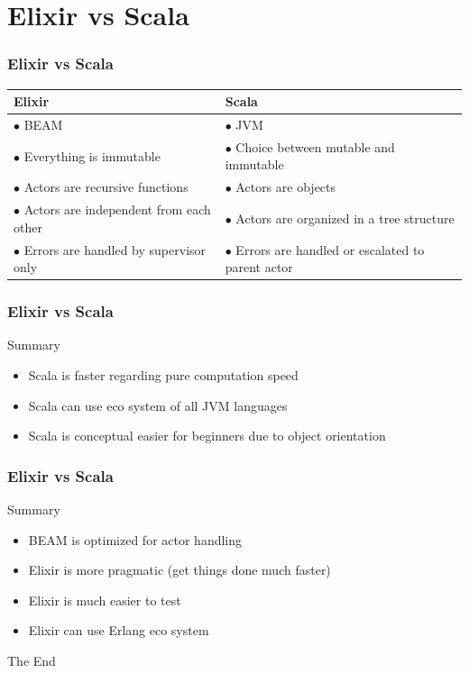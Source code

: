 \documentclass{beamer}
\begin{document}

\section{Elixir vs Scala}


\begin{frame}
\frametitle{Elixir vs Scala}
\begin{table}
\begin{tabular}{p{5cm} p{5cm}}
\toprule
\textbf{Elixir} & \textbf{Scala}\\
\midrule
$\bullet$ BEAM & $\bullet$ JVM \\
$\bullet$ Everything is immutable & $\bullet$ Choice between mutable and immutable\\
$\bullet$ Actors are recursive functions & $\bullet$ Actors are objects\\
$\bullet$ Actors are independent from each other & $\bullet$ Actors are organized in a tree structure \\
$\bullet$ Errors are handled by supervisor only & $\bullet$ Errors are handled or escalated to parent actor\\\bottomrule
\end{tabular}
\end{table}
\end{frame}



\begin{frame}
\frametitle{Elixir vs Scala}
\Huge{Summary}
\Large
\begin{itemize}
\item Scala is faster regarding pure computation speed
\item Scala can use eco system of all JVM languages
\item Scala is conceptual easier for beginners due to object orientation
\end{itemize}
\end{frame}


\begin{frame}
\frametitle{Elixir vs Scala}
\Huge{Summary}
\Large
\begin{itemize}
\item BEAM is optimized for actor handling
\item Elixir is more pragmatic (get things done much faster)
\item Elixir is much easier to test
\item Elixir can use Erlang eco system
\end{itemize}
\end{frame}



\begin{frame}
\Huge{\centerline{The End}}
\end{frame}

\end{document}

